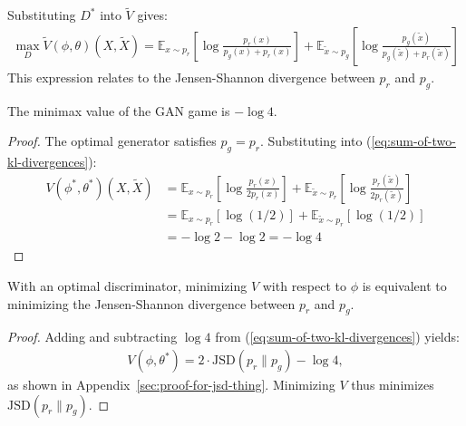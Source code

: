 Substituting $D^*$ into $\tilde{V}$ gives:
\begin{align}
	\label{eq:sum-of-two-kl-divergences}
	\max_D \tilde{V}(\phi, \theta)(X, \tilde{X}) = \mathbb{E}_{x \sim p_r}\left[\log\frac{p_r(x)}{p_g(x) + p_r(x)}\right] + \mathbb{E}_{\tilde{x} \sim p_g}\left[\log\frac{p_g(\tilde{x})}{p_g(\tilde{x}) + p_r(\tilde{x})} \right]
\end{align}
This expression relates to the Jensen-Shannon divergence between $p_r$ and $p_g$.
\begin{lemma}
	The minimax value of the GAN game is $-\log 4$.
\end{lemma}
\begin{proof}
	The optimal generator satisfies $p_g = p_r$. Substituting into (\ref{eq:sum-of-two-kl-divergences}):
	\begin{align}
		V(\phi^*, \theta^*)(X, \tilde{X}) & = \mathbb{E}_{x \sim p_r}\left[\log\frac{p_r(x)}{2p_r(x)}\right] + \mathbb{E}_{\tilde{x} \sim p_r}\left[\log\frac{p_r(\tilde{x})}{2p_r(\tilde{x})}\right] \\
		                                  & = \mathbb{E}_{x \sim p_r}[\log(1/2)] + \mathbb{E}_{\tilde{x} \sim p_r}[\log(1/2)]                                                                         \\
		                                  & = -\log 2 - \log 2 = -\log 4
	\end{align}
\end{proof}
\begin{theorem}%
	\label{thm:limiting}
	With an optimal discriminator, minimizing $V$ with respect to $\phi$ is equivalent to minimizing the Jensen-Shannon divergence between $p_r$ and $p_g$.
\end{theorem}
\begin{proof}
	Adding and subtracting $\log 4$ from (\ref{eq:sum-of-two-kl-divergences}) yields:
	\begin{align}
		\label{eq:desired}
		V(\phi, \theta^*) = 2 \cdot \text{JSD}(p_r \| p_g) - \log 4,
	\end{align}
	as shown in Appendix~\ref{sec:proof-for-jsd-thing}. Minimizing $V$ thus minimizes $\text{JSD}(p_r \| p_g)$.
\end{proof}
